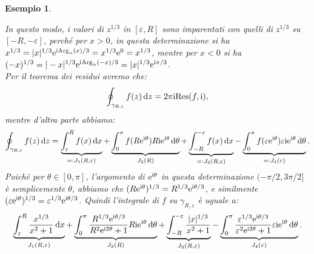 \documentclass[11pt]{book}
\theoremstyle{Definizione}
\theoremstyle{TeoremaProposizioneLemmaCorollarioCongettura}
\theoremstyle{OsservazioneNotaEsempio}
\newtheorem{myes}{Esempio}[section]
\newcommand{\Arg}[1][]{\textup{Arg}_{#1}}
\renewcommand{\i}{\textup{i}}
\newcommand{\e}{\textup{e}}
\renewcommand{\d}{\mathrm{d}}
\newcommand{\dz}{\,\d z}
\newcommand{\dx}{\,\d x}
\newcommand{\dtheta}{\, \d \theta}
\newcommand{\Res}{\textup{Res}}
\newcommand{\frecciaIn}{
\tikz \draw[-latex] (-1pt,0) -- (1pt,0);
}
\newcommand{\frecciaOut}{
\tikz \draw[latex-] (-1pt,0) -- (1pt,0);
}
\begin{document}
\begin{myes}
\begin{center}
\end{center}
In questo modo, i valori di $z^{1/3}$ in $[\varepsilon, R]$ sono imparentati con quelli di $z^{1/3}$ su $[-R,-\varepsilon]$, perché per $x > 0$, in questa determinazione si ha $x^{1/3} = |x|^{1/3} \e^{ \i \Arg[\alpha](x)/3} = x^{1/3}\e^{0} = x^{1/3}$, mentre per $x < 0$ si ha $(-x)^{1/3} = |-x|^{1/3} \e^{\i \Arg[\alpha](-x)/3} = |x|^{1/3} \e^{\i \pi/3}$.\\
Per il teorema dei residui avremo che:
$$
\oint_{\gamma_{R,\varepsilon}} f(z) \dz = 2\pi\i \Res(f,\i),
$$
mentre d'altra parte abbiamo:
$$
\oint_{\gamma_{R,\varepsilon}} f(z)\dz = \underbrace{\int_{\varepsilon}^{R} f(x) \dx}_{=:J_1(R,\varepsilon)} + \underbrace{\int_{0}^{\pi} f(R\e^{\i\theta}) R\i\e^{\i\theta}\dtheta}_{J_2(R)} + \underbrace{\int_{-R}^{-\varepsilon} f(x)\dx}_{=: J_3(R,\varepsilon)} - \underbrace{\int_{0}^{\pi} f(\varepsilon\e^{\i\theta})\varepsilon\i\e^{\i\theta}\dtheta}_{=:J_4(\varepsilon)}.
$$
Poiché per $\theta\in [0,\pi]$, l'argomento di $\e^{\i\theta}$ in questa determinazione $(-\pi/2,3\pi/2]$ è semplicemente $\theta$, abbiamo che $(R\e^{\i\theta})^{1/3} = R^{1/3} \e^{\i\theta/3}$, e similmente $(\varepsilon \e^{\i\theta})^{1/3} = \varepsilon^{1/3}\e^{\i\theta/3}$. Quindi l'integrale di $f$ su $\gamma_{R,\varepsilon}$ è uguale a:
$$
\underbrace{\int_{\varepsilon}^{R} \frac{x^{1/3}}{x^2+1}\dx}_{J_1(R,\varepsilon)} + \underbrace{\int_{0}^{\pi} \frac{R^{1/3}\e^{\i\theta/3}}{R^2\e^{\i 2\theta} + 1} R\i\e^{\i\theta}\dtheta}_{J_2(R)} + \underbrace{\int_{-R}^{-\varepsilon} \frac{|x|^{1/3}}{x^2+1}}_{ J_3(R,\varepsilon)} - \underbrace{\int_{0}^{\pi} \frac{\varepsilon^{1/3}\e^{\i\theta/3}}{\varepsilon^2\e^{\i 2\theta} + 1}\varepsilon\i\e^{\i\theta}\dtheta}_{J_4(\varepsilon)}.
$$
\end{myes}
\end{document}
